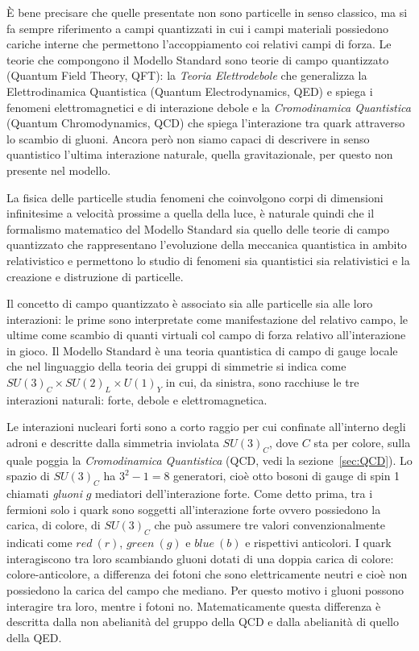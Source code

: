     È bene precisare che quelle presentate non sono particelle in senso classico, ma si fa sempre riferimento a campi quantizzati in cui i campi materiali possiedono cariche interne che permettono l'accoppiamento coi relativi campi di forza. Le teorie che compongono il Modello Standard sono teorie di campo quantizzato (Quantum Field Theory, QFT): la \textit{Teoria Elettrodebole} che generalizza la Elettrodinamica Quantistica (Quantum Electrodynamics, QED) e spiega i fenomeni elettromagnetici e di interazione debole e la \textit{Cromodinamica Quantistica} (Quantum Chromodynamics, QCD) che spiega l'interazione tra quark attraverso lo scambio di gluoni. Ancora però non siamo capaci di descrivere in senso quantistico l'ultima interazione naturale, quella gravitazionale, per questo non presente nel modello.

    La fisica delle particelle studia fenomeni che coinvolgono corpi di dimensioni infinitesime a velocità prossime a quella della luce, è naturale quindi che il formalismo matematico del Modello Standard sia quello delle teorie di campo quantizzato che rappresentano l'evoluzione della meccanica quantistica in ambito relativistico e permettono lo studio di fenomeni sia quantistici sia relativistici e la creazione e distruzione di particelle.
    
    Il concetto di campo quantizzato è associato sia alle particelle sia alle loro interazioni: le prime sono interpretate come manifestazione del relativo campo, le ultime come scambio di quanti virtuali col campo di forza relativo all'interazione in gioco. Il Modello Standard è una teoria quantistica di campo di gauge locale che nel linguaggio della teoria dei gruppi di simmetrie si indica come $SU(3)_C \times SU(2)_L \times U(1)_Y$ in cui, da sinistra, sono racchiuse le tre interazioni naturali: forte, debole e elettromagnetica.

    Le interazioni nucleari forti sono a corto raggio per cui confinate all'interno degli adroni e descritte dalla simmetria inviolata $SU(3)_C$, dove $C$ sta per colore, sulla quale poggia la \textit{Cromodinamica Quantistica} (QCD, vedi la sezione~\ref{sec:QCD}). Lo spazio di $SU(3)_C$ ha $3^2 - 1 = 8$ generatori, cioè otto bosoni di gauge di spin 1 chiamati \textit{gluoni} $g$ mediatori dell'interazione forte. Come detto prima, tra i fermioni solo i quark sono soggetti all'interazione forte ovvero possiedono la carica, di colore, di $SU(3)_C$ che può assumere tre valori convenzionalmente indicati come $red\ (r)$, $green\ (g)$ e $blue\ (b)$ e rispettivi anticolori. I quark interagiscono tra loro scambiando gluoni dotati di una doppia carica di colore: colore-anticolore, a differenza dei fotoni che sono elettricamente neutri e cioè non possiedono la carica del campo che mediano. Per questo motivo i gluoni possono interagire tra loro, mentre i fotoni no. Matematicamente questa differenza è descritta dalla non abelianità del gruppo della QCD e dalla abelianità di quello della QED.

